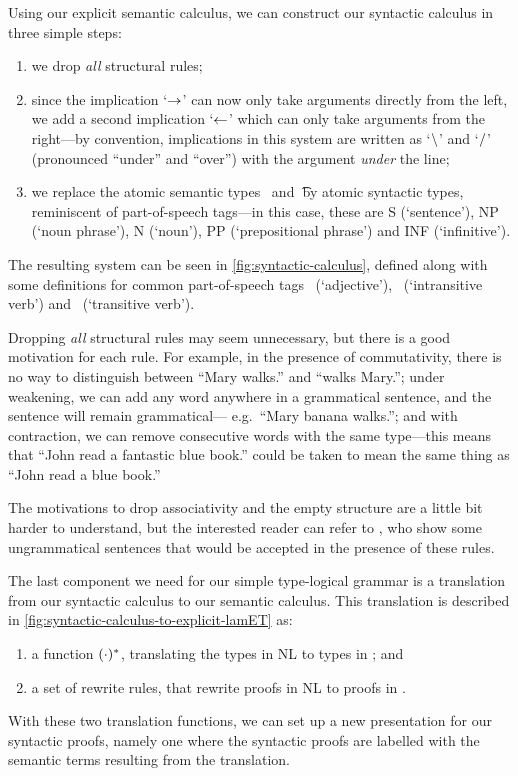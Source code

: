 Using our explicit semantic calculus, we can construct our syntactic
calculus in three simple steps:
\begin{enumerate}
\item%
  we drop \emph{all} structural rules;
\item%
  since the implication `$\rightarrow$' can now only take arguments directly
  from the left, we add a second implication `$\leftarrow$' which can only
  take arguments from the right---by convention, implications in this
  system are written as `$\mathbin{\backslash}$' and `$\mathbin{\slash}$' (pronounced ``under''
  and ``over'') with the argument \emph{under} the line;
\item%
  we replace the atomic semantic types \e\ and \t\ by atomic syntactic
  types, reminiscent of part-of-speech tags---in this case, these
  are S (`sentence'), NP (`noun phrase'), N (`noun'), PP
  (`prepositional phrase') and INF (`infinitive').
\end{enumerate}
The resulting system can be seen in \autoref{fig:syntactic-calculus},
defined along with some definitions for common part-of-speech tags \A\
(`adjective'), \IV\ (`intransitive verb') and \TV\ (`transitive verb').



Dropping \emph{all} structural rules may seem unnecessary, but there
is a good motivation for each rule.  For example, in the presence of
commutativity, there is no way to distinguish between ``Mary walks.''
and ``walks Mary.''; under weakening, we can add any word anywhere in a
grammatical sentence, and the sentence will remain grammatical---
e.g.\ ``Mary banana walks.''; and with contraction, we can remove
consecutive words with the same type---this means that ``John read
a fantastic blue book.'' could be taken to mean the same thing as
``John read a blue book.''

The motivations to drop associativity and the empty structure are a
little bit harder to understand, but the interested reader can refer
to \citet[p. 33, 105-106]{moot2012}, who show some ungrammatical
sentences that would be accepted in the presence of these rules.

\vspace*{1\baselineskip}

The last component we need for our simple type-logical grammar is a
translation from our syntactic calculus to our semantic calculus. This
translation is described in
\autoref{fig:syntactic-calculus-to-explicit-lamET} as:
\begin{enumerate}[label=(\arabic*)]
\item
  a function $({\cdot})^*$, translating the types in NL to types in \lamET; and
\item
  a set of rewrite rules, that rewrite proofs in NL to proofs in \lamET.
\end{enumerate}
With these two translation functions, we can set up a new presentation
for our syntactic proofs, namely one where the syntactic proofs are
labelled with the semantic terms resulting from the translation.

